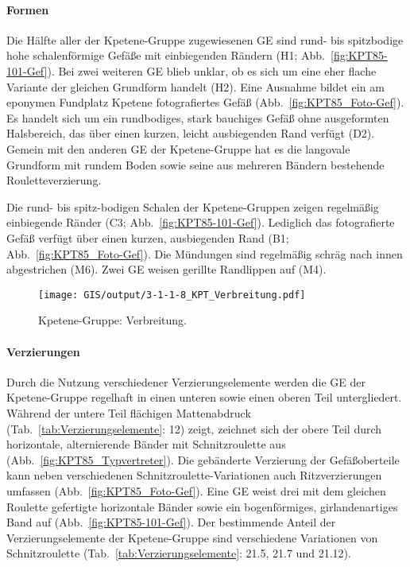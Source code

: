 \paragraph{Formen}
$\;$ \\
Die Hälfte aller der Kpetene-Gruppe zugewiesenen GE sind rund- bis spitzbodige hohe schalenförmige Gefäße mit einbiegenden Rändern (H1; Abb.~\ref{fig:KPT85-101-Gef}). Bei zwei weiteren GE blieb unklar, ob es sich um eine eher flache Variante der gleichen Grundform handelt (H2). Eine Ausnahme bildet ein am eponymen Fundplatz Kpetene fotografiertes Gefäß (Abb.~\ref{fig:KPT85_Foto-Gef}). Es handelt sich um ein rundbodiges, stark bauchiges Gefäß ohne ausgeformten Halsbereich, das über einen kurzen, leicht ausbiegenden Rand verfügt (D2). Gemein mit den anderen GE der Kpetene-Gruppe hat es die langovale Grundform mit rundem Boden sowie seine aus mehreren Bändern bestehende Rouletteverzierung.

Die rund- bis spitz-bodigen Schalen der Kpetene-Gruppen zeigen regelmäßig einbiegende Ränder (C3; Abb.~\ref{fig:KPT85-101-Gef}). Lediglich das fotografierte Gefäß verfügt über einen kurzen, ausbiegenden Rand (B1; Abb.~\ref{fig:KPT85_Foto-Gef}). Die Mündungen sind regelmäßig schräg nach innen abgestrichen (M6). Zwei GE weisen gerillte Randlippen auf (M4).

\begin{figure*}[p]
	\centering
	\texttt{[image: GIS/output/3-1-1-8\_KPT\_Verbreitung.pdf]}
	\caption{Kpetene-Gruppe: Verbreitung.}
	\label{fig:KPT_Verbreitung}
\end{figure*}

\paragraph{Verzierungen}
$\;$ \\
Durch die Nutzung verschiedener Verzierungselemente werden die GE der Kpetene-Gruppe regelhaft in einen unteren sowie einen oberen Teil untergliedert. Während der untere Teil flächigen Mattenabdruck (Tab.~\ref{tab:Verzierungselemente}: 12) zeigt, zeichnet sich der obere Teil durch horizontale, alternierende Bänder mit Schnitzroulette aus (Abb.~\ref{fig:KPT85_Typvertreter}). Die gebänderte Verzierung der Gefäßoberteile kann neben verschiedenen Schnitzroulette-Variationen auch Ritzverzierungen umfassen (Abb.~\ref{fig:KPT85_Foto-Gef}). Eine GE weist drei mit dem gleichen Roulette gefertigte horizontale  Bänder sowie ein bogenförmiges, girlandenartiges Band auf (Abb.~\ref{fig:KPT85-101-Gef}). Der bestimmende Anteil der Verzierungselemente der Kpetene-Gruppe sind verschiedene Variationen von Schnitzroulette (Tab.~\ref{tab:Verzierungselemente}: 21.5, 21.7 und 21.12).

